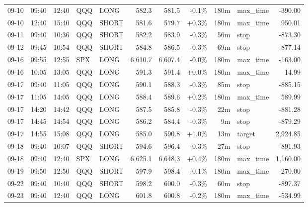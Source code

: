\documentclass[11pt,a4paper,twoside]{article}
\begin{document}
\begin{center}
\begin{longtable}{>{\color{txtmain}}l l l l l r r r r >{\color{txtmain}}l r}
09-10 & 09:40 & 12:40 & QQQ & LONG & 582.3 & 581.5 & \textcolor{lossred}{-0.1\%} & 180m & max\_time & \textcolor{lossred}{-390.00} \\
09-10 & 12:40 & 15:40 & QQQ & SHORT & 581.6 & 579.7 & \textcolor{wingreen}{+0.3\%} & 180m & max\_time & \textcolor{wingreen}{950.01} \\
09-11 & 09:40 & 10:36 & QQQ & SHORT & 582.2 & 583.9 & \textcolor{lossred}{-0.3\%} & 56m & stop & \textcolor{lossred}{-873.30} \\
09-12 & 09:45 & 10:54 & QQQ & SHORT & 584.8 & 586.5 & \textcolor{lossred}{-0.3\%} & 69m & stop & \textcolor{lossred}{-877.14} \\
09-16 & 09:55 & 12:55 & SPX & LONG & 6,610.7 & 6,607.4 & \textcolor{lossred}{-0.0\%} & 180m & max\_time & \textcolor{lossred}{-163.00} \\
09-16 & 10:05 & 13:05 & QQQ & LONG & 591.3 & 591.4 & \textcolor{wingreen}{+0.0\%} & 180m & max\_time & \textcolor{wingreen}{14.99} \\
09-17 & 09:40 & 11:05 & QQQ & LONG & 590.1 & 588.3 & \textcolor{lossred}{-0.3\%} & 85m & stop & \textcolor{lossred}{-885.15} \\
09-17 & 11:05 & 14:05 & QQQ & LONG & 588.4 & 589.6 & \textcolor{wingreen}{+0.2\%} & 180m & max\_time & \textcolor{wingreen}{589.99} \\
09-17 & 14:20 & 14:42 & QQQ & LONG & 587.5 & 585.8 & \textcolor{lossred}{-0.3\%} & 22m & stop & \textcolor{lossred}{-881.28} \\
09-17 & 14:45 & 14:54 & QQQ & LONG & 586.2 & 584.4 & \textcolor{lossred}{-0.3\%} & 9m & stop & \textcolor{lossred}{-879.29} \\
09-17 & 14:55 & 15:08 & QQQ & LONG & 585.0 & 590.8 & \textcolor{wingreen}{+1.0\%} & 13m & target & \textcolor{wingreen}{2,924.85} \\
09-18 & 09:40 & 10:07 & QQQ & SHORT & 594.6 & 596.4 & \textcolor{lossred}{-0.3\%} & 27m & stop & \textcolor{lossred}{-891.93} \\
09-18 & 09:40 & 12:40 & SPX & LONG & 6,625.1 & 6,648.3 & \textcolor{wingreen}{+0.4\%} & 180m & max\_time & \textcolor{wingreen}{1,160.00} \\
09-19 & 09:50 & 12:50 & QQQ & SHORT & 597.9 & 598.4 & \textcolor{lossred}{-0.1\%} & 180m & max\_time & \textcolor{lossred}{-270.00} \\
09-22 & 09:40 & 10:40 & QQQ & SHORT & 598.2 & 600.0 & \textcolor{lossred}{-0.3\%} & 60m & stop & \textcolor{lossred}{-897.37} \\
09-23 & 09:40 & 12:40 & QQQ & LONG & 601.8 & 600.8 & \textcolor{lossred}{-0.2\%} & 180m & max\_time & \textcolor{lossred}{-534.99} \\

\end{longtable}
\end{center}
\end{document}
